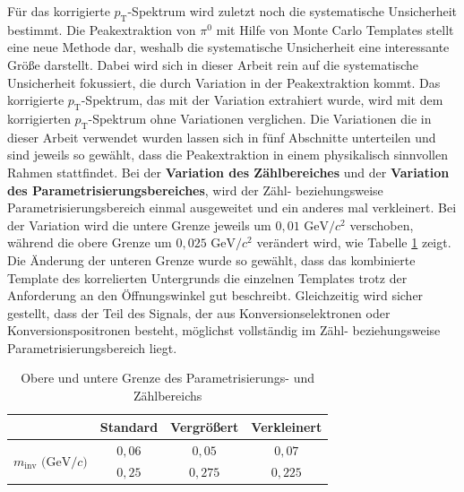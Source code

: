 Für das korrigierte $p_\text{T}$-Spektrum wird zuletzt noch die systematische Unsicherheit bestimmt.
Die Peakextraktion von $\pi^{0}$ mit Hilfe von Monte Carlo Templates stellt eine neue Methode dar, weshalb die systematische Unsicherheit eine interessante Größe darstellt. 
Dabei wird sich in dieser Arbeit rein auf die systematische Unsicherheit fokussiert, die durch Variation in der Peakextraktion kommt.
Das korrigierte $p_\text{T}$-Spektrum, das mit der Variation extrahiert wurde, wird mit dem korrigierten $p_\text{T}$-Spektrum ohne Variationen verglichen.
Die Variationen die in dieser Arbeit verwendet wurden lassen sich in fünf Abschnitte unterteilen und sind jeweils so gewählt, dass die Peakextraktion in einem physikalisch sinnvollen Rahmen stattfindet.
\newline
Bei der \textbf{Variation des Zählbereiches} und der \textbf{Variation des Parametrisierungsbereiches}, wird der Zähl- beziehungsweise Parametrisierungsbereich einmal ausgeweitet und ein anderes mal verkleinert.
Bei der Variation wird die untere Grenze jeweils um $0,01 \text{ GeV}/c^{2}$ verschoben, während die obere Grenze um $0,025 \text{ GeV}/c^{2}$ verändert wird, wie Tabelle \ref{tab:ParamAndIntRange} zeigt.
Die Änderung der unteren Grenze wurde so gewählt, dass das kombinierte Template des korrelierten Untergrunds die einzelnen Templates trotz der Anforderung an den Öffnungswinkel gut beschreibt.
Gleichzeitig wird sicher gestellt, dass der Teil des Signals, der aus Konversionselektronen oder Konversionspositronen besteht, möglichst vollständig im Zähl- beziehungsweise Parametrisierungsbereich liegt.
\begin{table}[b!]
\centering
\begin{tabular}{c|c||c||c|}
\cline{2-4}
                                                                      & Standard & Vergr{\"o}{\ss}ert & Verkleinert \\ \hline
\multicolumn{1}{|c|}{\multirow{2}{*}{$m_\text{inv}\text{ (GeV}/c)$}} & $0,06$   & $0,05$             & $0,07$      \\ \cline{2-4} 
\multicolumn{1}{|c|}{}                                                & $0,25$   & $0,275$            & $0,225$     \\ \hline
\end{tabular}
\caption{Obere und untere Grenze des Parametrisierungs- und Zählbereichs}
\label{tab:ParamAndIntRange}
\end{table}
